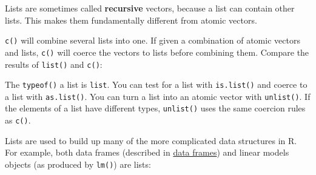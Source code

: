 Lists are sometimes called \textbf{recursive} vectors, because a list
can contain other lists. This makes them fundamentally different from
atomic vectors.

\begin{Shaded}
\begin{Highlighting}[]
\StringTok{ }\NormalTok{(}\NormalTok{(}\NormalTok{(}\NormalTok{())))}
\end{Highlighting}
\end{Shaded}

\texttt{c()} will combine several lists into one. If given a combination
of atomic vectors and lists, \texttt{c()} will coerce the vectors to
lists before combining them. Compare the results of \texttt{list()} and
\texttt{c()}:

\begin{Shaded}
\begin{Highlighting}[]
\StringTok{ }\NormalTok{(}\NormalTok{(}\NormalTok{, }\NormalTok{), }\NormalTok{(}\NormalTok{, }\NormalTok{))}
\StringTok{ }\NormalTok{(}\NormalTok{(}\NormalTok{, }\NormalTok{), }\NormalTok{(}\NormalTok{, }\NormalTok{))}
\end{Highlighting}
\end{Shaded}

The \texttt{typeof()} a list is \texttt{list}. You can test for a list
with \texttt{is.list()} and coerce to a list with \texttt{as.list()}.
You can turn a list into an atomic vector with \texttt{unlist()}. If the
elements of a list have different types, \texttt{unlist()} uses the same
coercion rules as \texttt{c()}.

Lists are used to build up many of the more complicated data structures
in R. For example, both data frames (described in
\hyperref[data-frames]{data frames}) and linear models objects (as
produced by \texttt{lm()}) are lists:

